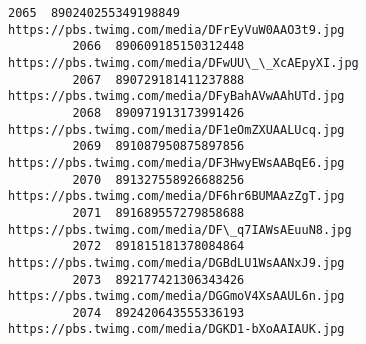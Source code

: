 \documentclass[11pt]{article}
\begin{document}
\begin{Verbatim}[commandchars=\\\{\}]
         2065  890240255349198849    https://pbs.twimg.com/media/DFrEyVuW0AAO3t9.jpg   
         2066  890609185150312448    https://pbs.twimg.com/media/DFwUU\_\_XcAEpyXI.jpg   
         2067  890729181411237888    https://pbs.twimg.com/media/DFyBahAVwAAhUTd.jpg   
         2068  890971913173991426    https://pbs.twimg.com/media/DF1eOmZXUAALUcq.jpg   
         2069  891087950875897856    https://pbs.twimg.com/media/DF3HwyEWsAABqE6.jpg   
         2070  891327558926688256    https://pbs.twimg.com/media/DF6hr6BUMAAzZgT.jpg   
         2071  891689557279858688    https://pbs.twimg.com/media/DF\_q7IAWsAEuuN8.jpg   
         2072  891815181378084864    https://pbs.twimg.com/media/DGBdLU1WsAANxJ9.jpg   
         2073  892177421306343426    https://pbs.twimg.com/media/DGGmoV4XsAAUL6n.jpg   
         2074  892420643555336193    https://pbs.twimg.com/media/DGKD1-bXoAAIAUK.jpg   
         

\end{Verbatim}
\end{document}
